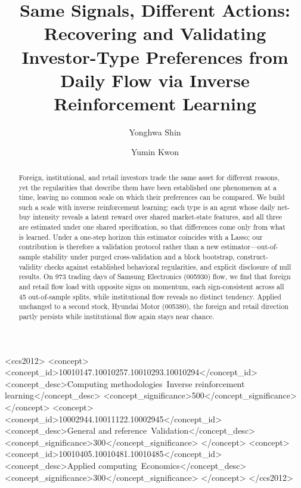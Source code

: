 \documentclass[sigconf,anonymous,review]{acmart}
\begin{document}
\title[Same Signals, Different Actions]{Same Signals, Different Actions:
  Recovering and Validating
  Investor-Type Preferences from Daily Flow via Inverse Reinforcement
  Learning}

\author{Yonghwa Shin}

\author{Yumin Kwon}

\begin{abstract}
Foreign, institutional, and retail investors trade the same asset for
different reasons, yet the regularities that describe them have been
established one phenomenon at a time, leaving no common scale on which
their preferences can be compared. We build such a scale with inverse
reinforcement learning: each type is an agent whose daily net-buy
intensity reveals a latent reward over shared market-state features, and
all three are estimated under one shared specification, so that
differences come only from what is learned. Under a one-step horizon this
estimator coincides with a Lasso; our contribution is therefore a
validation protocol rather than a new estimator---out-of-sample stability
under purged cross-validation and a block bootstrap, construct-validity
checks against established behavioral regularities, and explicit
disclosure of null results. On 973 trading days of Samsung Electronics
(005930) flow, we find that foreign and retail flow load with opposite
signs on momentum, each sign-consistent across all 45 out-of-sample
splits, while institutional flow reveals no distinct tendency. Applied
unchanged to a second stock, Hyundai Motor (005380), the foreign and
retail direction partly persists while institutional flow again stays
near chance.
\end{abstract}

\begin{CCSXML}
<ccs2012>
 <concept>
  <concept_id>10010147.10010257.10010293.10010294</concept_id>
  <concept_desc>Computing methodologies~Inverse reinforcement learning</concept_desc>
  <concept_significance>500</concept_significance>
 </concept>
 <concept>
  <concept_id>10002944.10011122.10002945</concept_id>
  <concept_desc>General and reference~Validation</concept_desc>
  <concept_significance>300</concept_significance>
 </concept>
 <concept>
  <concept_id>10010405.10010481.10010485</concept_id>
  <concept_desc>Applied computing~Economics</concept_desc>
  <concept_significance>300</concept_significance>
 </concept>
</ccs2012>
\end{CCSXML}
\end{document}
